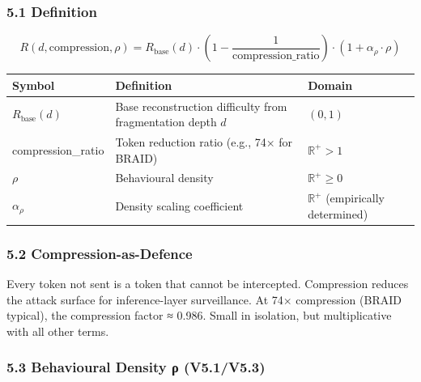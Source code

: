 \documentclass[
  11pt,
]{article}
\newcounter{none} %
\begin{document}
\subsubsection{5.1 Definition}\label{definition-2}

\[R(d, \text{compression}, \rho) = R_{\text{base}}(d) \cdot \left(1 - \frac{1}{\text{compression\_ratio}}\right) \cdot (1 + \alpha_\rho \cdot \rho)\]

{\def\LTcaptype{none} %
\begin{longtable}[]{@{}
  >{\raggedright\arraybackslash}p{}
  >{\raggedright\arraybackslash}p{}
  >{\raggedright\arraybackslash}p{}@{}}
\toprule\noalign{}
\begin{minipage}[b]{\linewidth}\raggedright
Symbol
\end{minipage} & \begin{minipage}[b]{\linewidth}\raggedright
Definition
\end{minipage} & \begin{minipage}[b]{\linewidth}\raggedright
Domain
\end{minipage} \\
\midrule\noalign{}
\endhead
\bottomrule\noalign{}
\endlastfoot
\(R_{\text{base}}(d)\) & Base reconstruction difficulty from
fragmentation depth \(d\) & \((0, 1)\) \\
compression\_ratio & Token reduction ratio (e.g., 74× for BRAID) &
\(\mathbb{R}^+ > 1\) \\
\(\rho\) & Behavioural density & \(\mathbb{R}^+ \geq 0\) \\
\(\alpha_\rho\) & Density scaling coefficient & \(\mathbb{R}^+\)
(empirically determined) \\
\end{longtable}
}

\subsubsection{5.2 Compression-as-Defence}\label{compression-as-defence}

Every token not sent is a token that cannot be intercepted. Compression
reduces the attack surface for inference-layer surveillance. At 74×
compression (BRAID typical), the compression factor ≈ 0.986. Small in
isolation, but multiplicative with all other terms.

\subsubsection{5.3 Behavioural Density ρ
(V5.1/V5.3)}\label{behavioural-density-ux3c1-v5.1v5.3}
\end{document}
